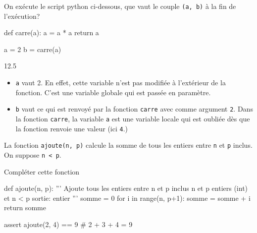 \documentclass[a4paper,10pt]{report}
\def\ptsexoA{2}
\def\ptsexoB{2}
\begin{document}

\renewcommand{\labelitemi}{\textbullet} %


\pagestyle{DS_FP}          %
\NomPrenomNote{}


\exods{\ptsexoA}


On exécute le script python ci-dessous, que vaut le couple \verb|(a, b)| à la fin de l'exécution?


\begin{CodePythontexAlt}[TaillePolice=\large,Largeur=1\linewidth,Centre,PremLigne=1]{}
def carre(a):
    a = a * a
    return a

a = 2
b = carre(a)
\end{CodePythontexAlt}


    \begin{answer}{1}{2.5}  
    
    \begin{itemize}
        \item         \verb|a| vaut 2. En effet, cette variable n'est pas modifiée à l'extérieur de la fonction. C'est une variable globale qui est passée en paramètre.
        \item \verb|b| vaut ce qui est renvoyé par la fonction \verb|carre| avec comme argument \verb|2|. Dans la fonction \verb|carre|, la variable \verb|a| est une variable locale qui est oubliée dès que la fonction renvoie une valeur (ici \verb|4|.)
    \end{itemize}

    \end{answer}

\medskip

\exods{\ptsexoB}

La fonction \verb|ajoute(n, p)| calcule la somme de tous les entiers entre \verb|n| et \verb|p| inclus. On suppose \verb|n < p|.

Compléter cette fonction

\begin{CodePythontexAlt}[TaillePolice=\large,Largeur=1\linewidth,Centre,PremLigne=1]{}
def ajoute(n, p):
    ''' Ajoute tous les entiers entre n et p inclus
    n et p entiers (int) et n < p
    sortie: entier '''
    somme = 0 
    for i in range(n, p+1):
        somme = somme + i
    return somme 

assert ajoute(2, 4) == 9    # 2 + 3 + 4 = 9
    \end{CodePythontexAlt}
\end{document}
